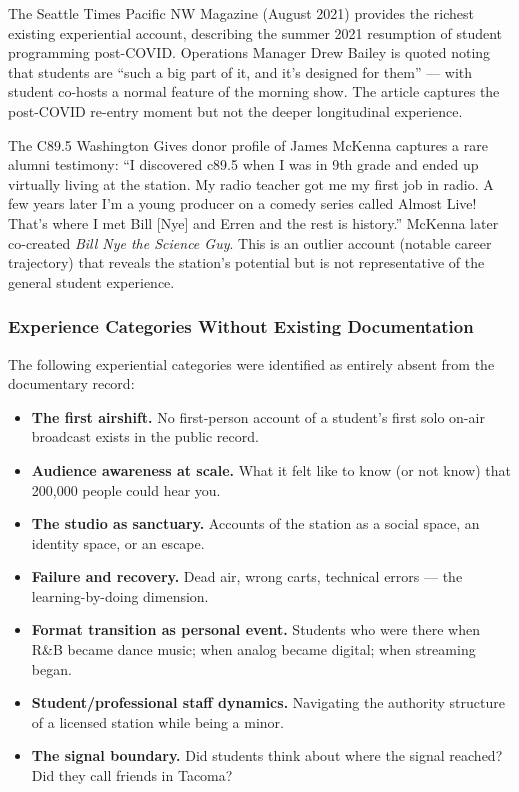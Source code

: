 \documentclass[11pt,letterpaper]{article}
\begin{document}
The Seattle Times Pacific NW Magazine (August 2021) provides the richest existing experiential account, describing the summer 2021 resumption of student programming post-COVID. Operations Manager Drew Bailey is quoted noting that students are ``such a big part of it, and it's designed for them'' --- with student co-hosts a normal feature of the morning show. The article captures the post-COVID re-entry moment but not the deeper longitudinal experience.

The C89.5 Washington Gives donor profile of James McKenna captures a rare alumni testimony: ``I discovered c89.5 when I was in 9th grade and ended up virtually living at the station. My radio teacher got me my first job in radio. A few years later I'm a young producer on a comedy series called Almost Live! That's where I met Bill [Nye] and Erren and the rest is history.'' McKenna later co-created \textit{Bill Nye the Science Guy}. This is an outlier account (notable career trajectory) that reveals the station's potential but is not representative of the general student experience.

\subsubsection{Experience Categories Without Existing Documentation}

The following experiential categories were identified as entirely absent from the documentary record:

\begin{itemize}
  \item \textbf{The first airshift.} No first-person account of a student's first solo on-air broadcast exists in the public record.
  \item \textbf{Audience awareness at scale.} What it felt like to know (or not know) that 200,000 people could hear you.
  \item \textbf{The studio as sanctuary.} Accounts of the station as a social space, an identity space, or an escape.
  \item \textbf{Failure and recovery.} Dead air, wrong carts, technical errors --- the learning-by-doing dimension.
  \item \textbf{Format transition as personal event.} Students who were there when R\&B became dance music; when analog became digital; when streaming began.
  \item \textbf{Student/professional staff dynamics.} Navigating the authority structure of a licensed station while being a minor.
  \item \textbf{The signal boundary.} Did students think about where the signal reached? Did they call friends in Tacoma?
\end{itemize}
\end{document}
